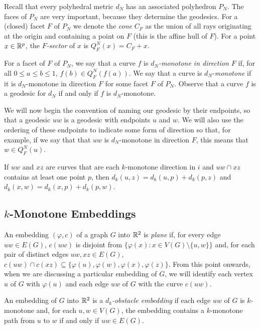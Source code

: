 \documentclass{patmorin}
\begin{document}
Recall that every polyhedral metric $d_N$ has an associated polyhedron
$P_N$.  The faces of $P_N$ are very important, because they determine the
geodesics.  For a (closed) facet $F$ of $P_N$ we denote the \emph{cone}
$C_F$ as the union of all rays originating at the origin and containing
a point on $F$ (this is the affine hull of $F$).  For a point $x\in\mathbb{R}^p$,
the \emph{$F$-sector} of $x$ is $Q^N_F(x)=C_F+x$.

For a facet of $F$ of $P_N$, we say that a curve $f$ is
\emph{$d_N$-monotone in direction $F$} if, for all $0\le a\le b\le 1$,
$f(b)\in Q^N_F(f(a))$.  We say that a curve is $d_N$-\emph{monotone} if it
is $d_N$-monotone in direction $F$ for some facet $F$ of $P_N$.  Observe
that a curve $f$ is a geodesic for $d_N$ if and only if $f$ is $d_N$-monotone.

We will now begin the convention of naming our geodesic by their
endpoints, so that a geodesic $uw$ is a geodesic with endpoints $u$
and $w$. We will also use the ordering of these endpoints to indicate
some form of direction so that, for example, if we say that that $uw$
is $d_N$-monotone in direction $F$, this means that $w\in Q^N_F(u)$.

\begin{obs}
   If $uw$ and $xz$ are curves that are each $k$-monotone direction in $i$
   and $uw\cap xz$ contains at least one point $p$, then $d_k(u,z) =
   d_k(u,p)+d_k(p,z)$ and $d_k(x,w)=d_k(x,p)+d_k(p,w)$.
\end{obs}

\subsection{$k$-Monotone Embeddings}

An embedding $(\varphi,c)$ of a graph $G$ into $\mathbb{R}^2$
is \emph{plane} if, for every edge $uw\in E(G)$, $c(uw)$
is disjoint from $\{\varphi(x) : x\in V(G)\setminus\{u,w\}\}$
and, for each pair of distinct edges $uw,xz\in E(G)$, $c(uw)\cap
c(xz)\subseteq\{\varphi(u),\varphi(w),\varphi(x),\varphi(z)\}$. 
From this point onwards, when we are discussing a particular embedding
of $G$, we will identify each vertex $u$ of $G$ with $\varphi(u)$ and
each edge $uw$ of $G$ with the curve $c(uw)$.

\begin{defn}
An embedding of $G$ into $\mathbb{R}^2$ is a \emph{$d_k$-obstacle embedding}
if each edge $uw$ of $G$ is $k$-monotone and, for each $u,w\in V(G)$,
the embedding contains a $k$-monotone path from $u$ to $w$ if and only
if $uw\in E(G)$.
\end{defn}
\end{document}
